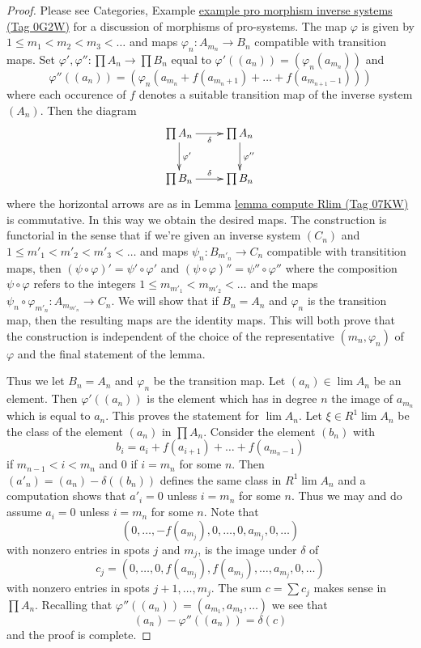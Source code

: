 \documentclass{amsart}
\theoremstyle{plain}
\theoremstyle{definition}
\theoremstyle{remark}
\numberwithin{equation}{subsection}
\def\lim{\mathop{\mathrm{lim}}\nolimits}
\begin{document}
\begin{proof}
Please see
Categories, Example \href{https://stacks.math.columbia.edu/tag/0G2W}{example pro morphism inverse systems (Tag 0G2W)}
for a discussion of morphisms of pro-systems.
The map $\varphi$ is given by $1 \leq m_1 < m_2 < m_3 < \ldots$
and maps $\varphi_n : A_{m_n} \to B_n$ compatible with transition
maps. Set $\varphi', \varphi'' : \prod A_n \to \prod B_n$
equal to
$\varphi'((a_n)) = (\varphi_n(a_{m_n}))$ and
$$
\varphi''((a_n)) =
(\varphi_n(a_{m_n} + f(a_{m_n + 1}) + \ldots + f(a_{m_{n + 1} - 1})))
$$
where each occurence of $f$ denotes a suitable transition map of
the inverse system $(A_n)$. Then the diagram
$$
\xymatrix{
\prod A_n \ar[r]_\delta \ar[d]^{\varphi'} &
\prod A_n \ar[d]^{\varphi''} \\
\prod B_n \ar[r]^\delta & \prod B_n
}
$$
where the horizontal arrows are as in Lemma \href{https://stacks.math.columbia.edu/tag/07KW}{lemma compute Rlim (Tag 07KW)}
is commutative. In this way we obtain the desired maps. The construction
is functorial in the sense that if we're given an inverse system $(C_n)$
and $1 \leq m'_1 < m'_2 < m'_3 < \ldots$ and maps $\psi_n : B_{m'_n} \to C_n$
compatible with transitition maps, then
$(\psi \circ \varphi)' = \psi' \circ \varphi'$ and
$(\psi \circ \varphi)'' = \psi'' \circ \varphi''$
where the composition $\psi \circ \varphi$ refers to the integers
$1 \leq m_{m'_1} < m_{m'_2} < \ldots$ and the maps
$\psi_n \circ \varphi_{m'_n} : A_{m_{m'_n}} \to C_n$. We will show
that if $B_n = A_n$ and $\varphi_n$ is the transition map, then
the resulting maps are the identity maps. This will both prove that
the construction is independent of the choice of the representative
$(m_n, \varphi_n)$ of $\varphi$ and the final statement of the lemma.

\medskip\noindent
Thus we let $B_n = A_n$ and $\varphi_n$ be the transition map.
Let $(a_n) \in \lim A_n$ be an element. Then $\varphi'((a_n))$
is the element which has in degree $n$ the image of $a_{m_n}$
which is equal to $a_n$. This proves the statement for $\lim A_n$.
Let $\xi \in R^1\lim A_n$ be the class of the element
$(a_n)$ in $\prod A_n$. Consider the element $(b_n)$ with
$$
b_i = a_i + f(a_{i + 1}) + \ldots + f(a_{m_n - 1})
$$
if $m_{n - 1} < i < m_n$ and $0$ if $i = m_n$ for some $n$.
Then $(a'_n) = (a_n) - \delta((b_n))$ defines the same class
in $R^1\lim A_n$ and a computation shows that $a'_i = 0$
unless $i = m_n$ for some $n$. Thus we may and do assume $a_i = 0$
unless $i = m_n$ for some $n$. Note that
$$
(0, \ldots, -f(a_{m_j}), 0, \ldots, 0, a_{m_j}, 0, \ldots)
$$
with nonzero entries in spots $j$ and $m_j$, is the image under $\delta$ of
$$
c_j = (0, \ldots, 0, f(a_{m_j}), f(a_{m_j}), \ldots, a_{m_j}, 0, \ldots)
$$
with nonzero entries in spots $j + 1, \ldots, m_j$. The sum
$c = \sum c_j$ makes sense in $\prod A_n$. Recalling that
$\varphi''((a_n)) = (a_{m_1}, a_{m_2}, \ldots)$ we see that
$$
(a_n) - \varphi''((a_n)) = \delta(c)
$$
and the proof is complete.
\end{proof}
\end{document}
